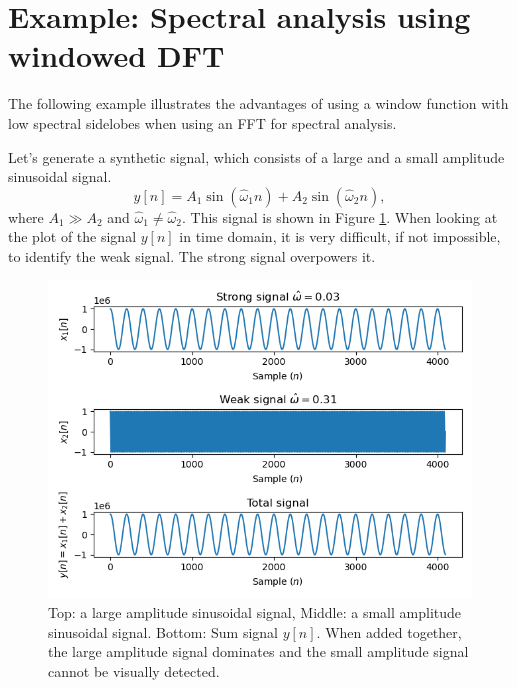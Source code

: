 \section{Example: Spectral analysis using windowed DFT}

The following example illustrates the advantages of using a window
function with low spectral sidelobes when using an FFT for spectral
analysis.

Let's generate a synthetic signal, which consists of a large and a small amplitude sinusoidal signal.
\begin{equation}
    y[n] = A_1 \sin(\hat{\omega}_1 n) + A_2 \sin(\hat{\omega}_2 n),
\end{equation}
where $A_1 \gg A_2$ and $\hat{\omega}_1 \ne \hat{\omega}_2$. This signal is shown in
Figure \ref{fig:strong_weak_time}. When looking at the plot of the
signal $y[n]$ in time domain, it is very difficult, if not impossible,
to identify the weak signal. The strong signal overpowers it.

\begin{figure}
    \begin{center}
        \includegraphics[width=\textwidth]{code/022_window_functions/windowed_signals.png}
    \end{center}
    \caption{Top: a large amplitude sinusoidal signal, Middle: a small amplitude sinusoidal signal.
        Bottom: Sum signal $y[n]$. When added together, the large amplitude signal dominates and
        the small amplitude signal cannot be visually detected.}
    \label{fig:strong_weak_time}
\end{figure}

